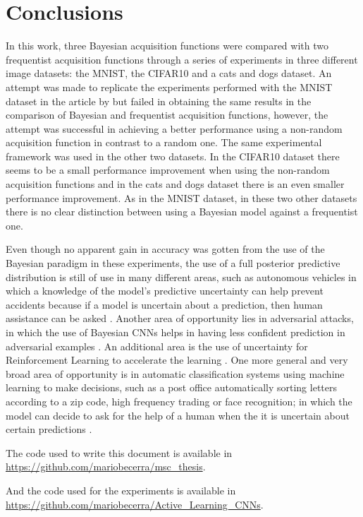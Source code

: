 
\chapter{Conclusions}
\label{ch:conclusions}


In this work, three Bayesian acquisition functions were compared with two frequentist acquisition functions through a series of experiments in three different image datasets: the MNIST, the CIFAR10 and a cats and dogs dataset. An attempt was made to replicate the experiments performed with the MNIST dataset in the article  by \citeauthor{Gal2016Active} but failed in obtaining the same results in the comparison of Bayesian and frequentist acquisition functions, however, the attempt was successful in achieving a better performance using a non-random acquisition function in contrast to a random one. The same experimental framework was used in the other two datasets. In the CIFAR10 dataset there seems to be a small performance improvement when using the non-random acquisition functions and in the cats and dogs dataset there is an even smaller performance improvement. As in the MNIST dataset, in these two other datasets there is no clear distinction between using a Bayesian model against a frequentist one.

Even though no apparent gain in accuracy was gotten from the use of the Bayesian paradigm in these experiments, the use of a full posterior predictive distribution is still of use in many different areas, such as autonomous vehicles in which a knowledge of the model's predictive uncertainty can help prevent accidents because if a model is uncertain about a prediction, then human assistance can be asked \cite{gal2016uncertainty} \cite{kendall2017uncertainties} \cite{michelmore2018evaluating}. Another area of opportunity lies in adversarial attacks, in which the use of Bayesian CNNs helps in having less confident prediction in adversarial examples \cite{li2017dropout} \cite{rawat2017adversarial} \cite{smith2018understanding}. An additional area is the use of uncertainty for Reinforcement Learning to accelerate the learning \cite{gal2016uncertainty}. One more general and very broad area of opportunity is in automatic classification systems using machine learning to make decisions, such as a post office automatically sorting letters according to a zip code, high frequency trading or face recognition; in which the model can decide to ask for the help of a human when the it is uncertain about certain predictions \cite{gal2016uncertainty}.

The code used to write this document is available in \url{https://github.com/mariobecerra/msc_thesis}.

And the code used for the experiments is available in \url{https://github.com/mariobecerra/Active_Learning_CNNs}.
